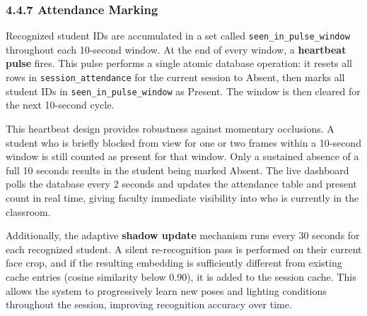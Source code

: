 \documentclass{report}
\begin{document}
\subsubsection*{4.4.7 Attendance Marking}
\normalsize{
Recognized student IDs are accumulated in a set called \texttt{seen\_in\_pulse\_window} throughout each\vspace{3pt} 10-second window. At the end of every window, a \textbf{heartbeat pulse} fires. This pulse performs a\vspace{3pt} single atomic database operation: it resets all rows in \texttt{session\_attendance} for the current session\vspace{3pt} to Absent, then marks all student IDs in \texttt{seen\_in\_pulse\_window} as Present. The window is then\vspace{3pt} cleared for the next 10-second cycle.

This heartbeat design provides robustness against momentary occlusions. A student who is briefly\vspace{3pt} blocked from view for one or two frames within a 10-second window is still counted as present for\vspace{3pt} that window. Only a sustained absence of a full 10 seconds results in the student being marked Absent.\vspace{3pt} The live dashboard polls the database every 2 seconds and updates the attendance table and present\vspace{3pt} count in real time, giving faculty immediate visibility into who is currently in the classroom.

Additionally, the adaptive \textbf{shadow update} mechanism runs every 30 seconds for each recognized\vspace{3pt} student. A silent re-recognition pass is performed on their current face crop, and if the resulting\vspace{3pt} embedding is sufficiently different from existing cache entries (cosine similarity below 0.90), it is\vspace{3pt} added to the session cache. This allows the system to progressively learn new poses and lighting\vspace{3pt} conditions throughout the session, improving recognition accuracy over time.
}
\end{document}
